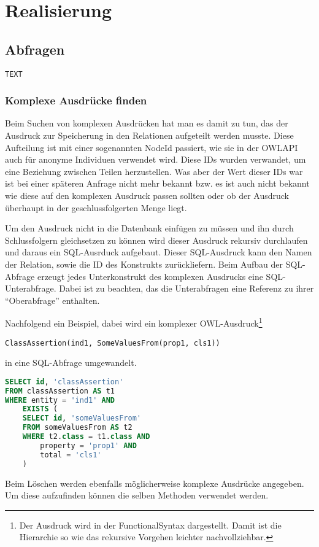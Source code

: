 \chapter{Realisierung}



\section{Abfragen}

\begin{verbatim}
TEXT
\end{verbatim}

\subsection{Komplexe Ausdrücke finden}
Beim Suchen von komplexen Ausdrücken hat man es damit zu tun, das der Ausdruck zur Speicherung in den Relationen aufgeteilt werden musste. Diese Aufteilung ist mit einer sogenannten NodeId passiert, wie sie in der OWLAPI auch für anonyme Individuen verwendet wird. Diese IDs wurden verwandet, um eine Beziehung zwischen Teilen herzustellen. Was aber der Wert dieser IDs war ist bei einer späteren Anfrage nicht mehr bekannt bzw. es ist auch nicht bekannt wie diese auf den komplexen Ausdruck passen sollten oder ob der Ausdruck überhaupt in der geschlussfolgerten Menge liegt.

Um den Ausdruck nicht in die Datenbank einfügen zu müssen und ihn durch Schlussfolgern gleichsetzen zu können wird dieser Ausdruck rekursiv durchlaufen und daraus ein SQL-Ausrduck aufgebaut. Dieser SQL-Ausdruck kann den Namen der Relation, sowie die ID des Konstrukts zurückliefern. Beim Aufbau der SQL-Abfrage erzeugt jedes Unterkonstrukt des komplexen Ausdrucks eine SQL-Unterabfrage. Dabei ist zu beachten, das die Unterabfragen eine Referenz zu ihrer ``Oberabfrage'' enthalten.

Nachfolgend ein Beispiel, dabei wird ein komplexer OWL-Ausdruck\footnote{Der Ausdruck wird in der FunctionalSyntax dargestellt. Damit ist die Hierarchie so wie das rekursive Vorgehen leichter nachvollziehbar.}

\begin{verbatim}
ClassAssertion(ind1, SomeValuesFrom(prop1, cls1))
\end{verbatim}

in eine SQL-Abfrage umgewandelt.

\begin{lstlisting}[language=SQL]
SELECT id, 'classAssertion'
FROM classAssertion AS t1
WHERE entity = 'ind1' AND
	EXISTS (
	SELECT id, 'someValuesFrom'
	FROM someValuesFrom AS t2
	WHERE t2.class = t1.class AND
		property = 'prop1' AND
		total = 'cls1'
	)
\end{lstlisting}

Beim Löschen werden ebenfalls möglicherweise komplexe Ausdrücke angegeben. Um diese aufzufinden können die selben Methoden verwendet werden.






